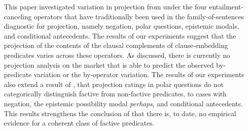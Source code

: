 \documentclass[a4paper,12pt,twoside]{article}
\begin{document}
This paper investigated variation in projection from under the four entailment-canceling operators that have traditionally been used in the family-of-sentences diagnostic for projection, namely negation, polar questions, epistemic modals, and conditional antecedents. The results of our experiments suggest that the projection of the contents of the clausal complements of clause-embedding predicates varies across these operators. As discussed, there is currently no projection analysis on the market that is able to predict the observed by-predicate variation or the by-operator variation. The results of our experiments also extend a result of \citealt{degen_are_2022}, that projection ratings in polar questions do not categorically distinguish factive from non-factive predicates, to cases with negation, the epistemic possibility modal \textit{perhaps}, and conditional antecedents. This results strengthens the conclusion of \citealt{degen_are_2022} that there is, to date, no empirical evidence for a coherent class of factive predicates.



\end{document}
